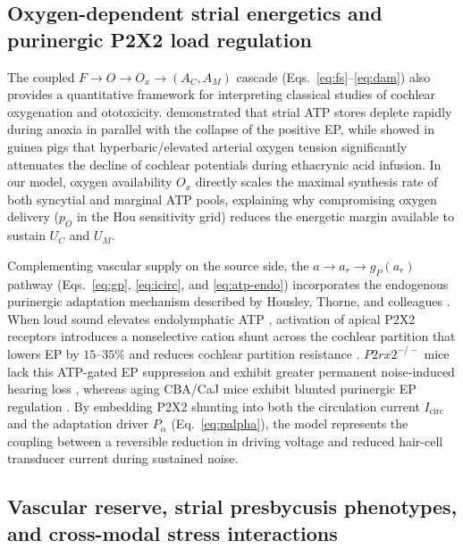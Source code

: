 \documentclass[final,5p,times]{elsarticle}
\begin{document}
\subsection{Oxygen-dependent strial energetics and purinergic P2X2 load regulation}\label{sec:alignment-purinergic}

The coupled \(F \to O \to O_x \to (A_C, A_M)\) cascade (Eqs.~\ref{eq:fs}--\ref{eq:dam}) also provides a quantitative framework for interpreting classical studies of cochlear oxygenation and ototoxicity. \citet{Kusakari1978} demonstrated that strial ATP stores deplete rapidly during anoxia in parallel with the collapse of the positive EP, while \citet{PrazmaPecorak1975} showed in guinea pigs that hyperbaric/elevated arterial oxygen tension significantly attenuates the decline of cochlear potentials during ethacrynic acid infusion. In our model, oxygen availability \(O_x\) directly scales the maximal synthesis rate of both syncytial and marginal ATP pools, explaining why compromising oxygen delivery (\(p_O\) in the Hou sensitivity grid) reduces the energetic margin available to sustain \(U_C\) and \(U_M\).

Complementing vascular supply on the source side, the \(a \to a_r \to g_P(a_r)\) pathway (Eqs.~\ref{eq:gp}, \ref{eq:icirc}, and \ref{eq:atp-endo}) incorporates the endogenous purinergic adaptation mechanism described by Housley, Thorne, and colleagues \citep{Munoz2001,Telang2010,Housley2013}. When loud sound elevates endolymphatic ATP \citep{Munoz2001}, activation of apical P2X2 receptors introduces a nonselective cation shunt across the cochlear partition that lowers EP by \(15\text{--}35\%\) and reduces cochlear partition resistance \citep{Telang2010,Housley2013}. \(P2rx2^{-/-}\) mice lack this ATP-gated EP suppression and exhibit greater permanent noise-induced hearing loss \citep{Housley2013}, whereas aging CBA/CaJ mice exhibit blunted purinergic EP regulation \citep{Telang2010}. By embedding P2X2 shunting into both the circulation current \(I_{\mathrm{circ}}\) and the adaptation driver \(P_\alpha\) (Eq.~\ref{eq:palpha}), the model represents the coupling between a reversible reduction in driving voltage and reduced hair-cell transducer current during sustained noise.

\subsection{Vascular reserve, strial presbycusis phenotypes, and cross-modal stress interactions}\label{sec:alignment-reserve}
\end{document}

